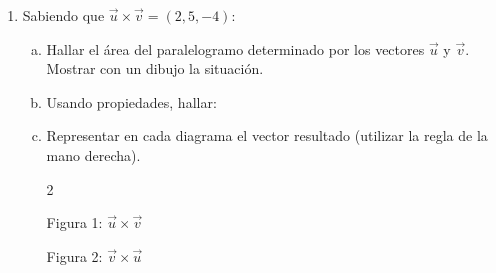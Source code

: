 \documentclass[11pt,a4paper]{article}
\begin{document}
\begin{enumerate}[\hspace{-5mm} 1) ]
\item Sabiendo que $\vec{u} \times \vec{v} = (2,5,-4)$:

\begin{enumerate}[a)]
    \item Hallar el área del paralelogramo determinado por los vectores $\vec{u}$ y $\vec{v}$. Mostrar con un dibujo la situación.
    
    \item Usando propiedades, hallar: \qquad\qquad 
    \begin{minipage}{.4\textwidth}
    \begin{enumerate}[i)]
    \end{enumerate}
        
    \end{minipage}
    
    \item Representar en cada diagrama el vector resultado (utilizar la regla de la mano derecha).

\vspace{-3mm}
\begin{multicols}{2} 
    \begin{center}
    Figura 1: $\vec{u} \times \vec{v}$\\[3mm]
    \end{center}

    \vspace{1cm}

    \begin{center}
    Figura 2: $\vec{v} \times \vec{u}$\\[3mm]
\end{center}
\end{multicols}
\end{enumerate}
\end{enumerate}
\end{document}
